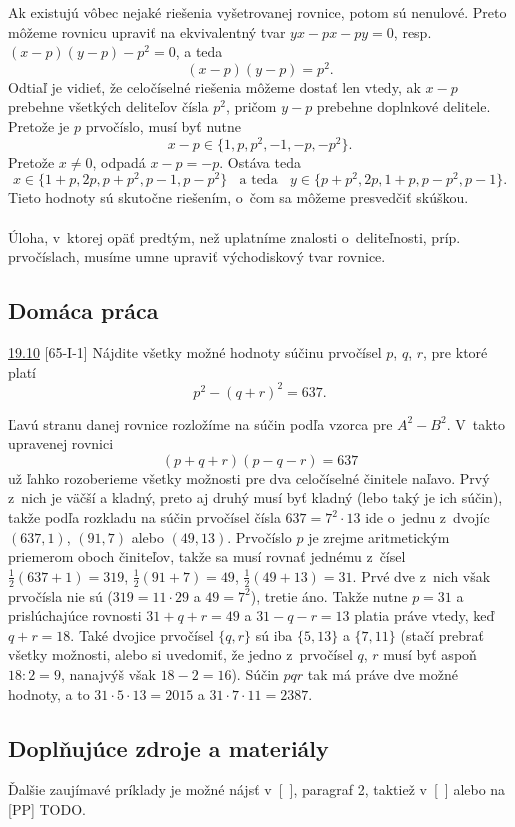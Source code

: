 \rieh Ak existujú vôbec nejaké riešenia vyšetrovanej rovnice, potom sú nenulové. Preto môžeme rovnicu upraviť na ekvivalentný tvar $yx-px-py=0$, resp. $(x-p)(y-p)-p^2=0$, a teda $$(x-p)(y-p)=p^2.$$ Odtiaľ je vidieť, že celočíselné riešenia môžeme dostať len vtedy, ak $x-p$ prebehne všetkých deliteľov čísla $p^2$, pričom $y-p$ prebehne doplnkové delitele. Pretože je $p$ prvočíslo, musí byť nutne $$x-p \in \{1, p, p^2, -1, -p, -p^2\}.$$ Pretože $x\neq 0$, odpadá $x-p=-p$. Ostáva teda $$x \in \{1+p, 2p, p+p^2, p-1, p-p^2\} \ \ \ \ \text{a teda} \ \ \ \ y \in \{p+p^2, 2p, 1+p, p-p^2, p-1\}.$$ Tieto hodnoty sú skutočne riešením, o~čom sa môžeme presvedčiť skúškou.\\
\\
\kom Úloha, v~ktorej opäť predtým, než uplatníme znalosti o~deliteľnosti, príp. prvočíslach, musíme umne upraviť východiskový tvar rovnice.


\subsection*{Domáca práca}

\begin{tcolorbox}[breakable,notitle,boxrule=0pt,colback=light-gray,colframe=light-gray]\ul{19.10} [65-I-1]
Nájdite všetky možné hodnoty súčinu prvočísel $p$, $q$, $r$, pre ktoré platí
$$p^2 - (q + r)^2= 637.$$

\end{tcolorbox}

\rieh Ľavú stranu danej rovnice rozložíme na súčin podľa vzorca pre $A^2 - B^2$. V~takto upravenej rovnici
$$(p + q + r)(p - q - r) = 637$$
už ľahko rozoberieme všetky možnosti pre dva celočíselné činitele naľavo. Prvý z~nich je väčší a kladný, preto aj druhý musí byť kladný (lebo taký je ich súčin), takže podľa rozkladu na súčin prvočísel čísla $637 = 7^2 \cdot 13$ ide o~jednu z~dvojíc $(637, 1)$, $(91, 7)$
alebo $(49, 13)$. Prvočíslo $p$ je zrejme aritmetickým priemerom oboch činiteľov, takže sa musí rovnať jednému z~čísel $\frac{1}{2}(637 + 1) = 319$, $\frac{1}{2}(91 + 7) = 49$, $\frac{1}{2}(49 + 13) = 31$. Prvé dve z~nich však prvočísla nie sú ($319 = 11 \cdot  29$ a $49 = 7^2$), tretie áno. Takže nutne $p = 31$ a prislúchajúce rovnosti $31 + q + r = 49$ a $31 - q - r = 13$ platia práve vtedy, keď $q + r = 18$. Také dvojice prvočísel $\{q, r\}$ sú iba $\{5, 13\}$ a $\{7, 11\}$ (stačí prebrať
všetky možnosti, alebo si uvedomiť, že jedno z~prvočísel $q$, $r$ musí byť aspoň $18 : 2 = 9$, nanajvýš však $18 - 2 = 16$). Súčin $pqr$ tak má práve dve možné hodnoty, a to $31 \cdot  5\cdot  13 = 2 015$ a $31 \cdot  7 \cdot  11 = 2 387$.\\

\subsection*{Doplňujúce zdroje a materiály}
Ďalšie zaujímavé príklady je možné nájsť v~[~\cite{herman2011}], paragraf 2, taktiež v~[~\cite{holton2010}] alebo na [PP] TODO.
